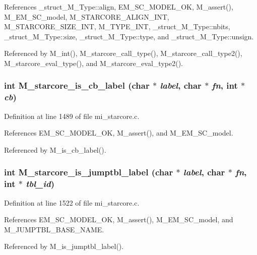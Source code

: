 References \_\-struct\_\-M\_\-Type::align, EM\_\-SC\_\-MODEL\_\-OK, M\_\-assert(), M\_\-EM\_\-SC\_\-model, M\_\-STARCORE\_\-ALIGN\_\-INT, M\_\-STARCORE\_\-SIZE\_\-INT, M\_\-TYPE\_\-INT, \_\-struct\_\-M\_\-Type::nbits, \_\-struct\_\-M\_\-Type::size, \_\-struct\_\-M\_\-Type::type, and \_\-struct\_\-M\_\-Type::unsign.

Referenced by M\_\-int(), M\_\-starcore\_\-call\_\-type(), M\_\-starcore\_\-call\_\-type2(), M\_\-starcore\_\-eval\_\-type(), and M\_\-starcore\_\-eval\_\-type2().
\subsubsection{\setlength{\rightskip}{0pt plus 5cm}int M\_\-starcore\_\-is\_\-cb\_\-label (char $\ast$ {\em label}, char $\ast$ {\em fn}, int $\ast$ {\em cb})}\label{mi__starcore_8c_66167aef621ee91b3dbbf9a29b918aa9}




Definition at line 1489 of file mi\_\-starcore.c.

References EM\_\-SC\_\-MODEL\_\-OK, M\_\-assert(), and M\_\-EM\_\-SC\_\-model.

Referenced by M\_\-is\_\-cb\_\-label().
\subsubsection{\setlength{\rightskip}{0pt plus 5cm}int M\_\-starcore\_\-is\_\-jumptbl\_\-label (char $\ast$ {\em label}, char $\ast$ {\em fn}, int $\ast$ {\em tbl\_\-id})}\label{mi__starcore_8c_812a1b48518c064ee77487911f1d4bb1}




Definition at line 1522 of file mi\_\-starcore.c.

References EM\_\-SC\_\-MODEL\_\-OK, M\_\-assert(), M\_\-EM\_\-SC\_\-model, and M\_\-JUMPTBL\_\-BASE\_\-NAME.

Referenced by M\_\-is\_\-jumptbl\_\-label().
